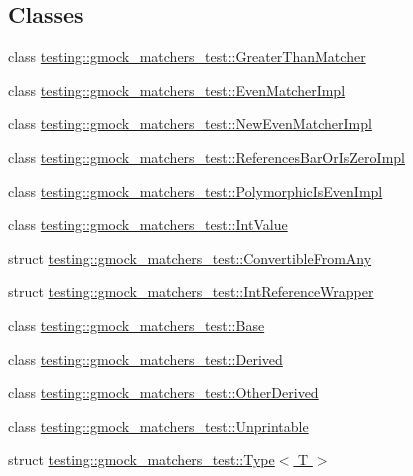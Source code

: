 \subsection*{Classes}
\begin{DoxyCompactItemize}
\item 
class \hyperlink{classtesting_1_1gmock__matchers__test_1_1_greater_than_matcher}{testing\+::gmock\+\_\+matchers\+\_\+test\+::\+Greater\+Than\+Matcher}
\item 
class \hyperlink{classtesting_1_1gmock__matchers__test_1_1_even_matcher_impl}{testing\+::gmock\+\_\+matchers\+\_\+test\+::\+Even\+Matcher\+Impl}
\item 
class \hyperlink{classtesting_1_1gmock__matchers__test_1_1_new_even_matcher_impl}{testing\+::gmock\+\_\+matchers\+\_\+test\+::\+New\+Even\+Matcher\+Impl}
\item 
class \hyperlink{classtesting_1_1gmock__matchers__test_1_1_references_bar_or_is_zero_impl}{testing\+::gmock\+\_\+matchers\+\_\+test\+::\+References\+Bar\+Or\+Is\+Zero\+Impl}
\item 
class \hyperlink{classtesting_1_1gmock__matchers__test_1_1_polymorphic_is_even_impl}{testing\+::gmock\+\_\+matchers\+\_\+test\+::\+Polymorphic\+Is\+Even\+Impl}
\item 
class \hyperlink{classtesting_1_1gmock__matchers__test_1_1_int_value}{testing\+::gmock\+\_\+matchers\+\_\+test\+::\+Int\+Value}
\item 
struct \hyperlink{structtesting_1_1gmock__matchers__test_1_1_convertible_from_any}{testing\+::gmock\+\_\+matchers\+\_\+test\+::\+Convertible\+From\+Any}
\item 
struct \hyperlink{structtesting_1_1gmock__matchers__test_1_1_int_reference_wrapper}{testing\+::gmock\+\_\+matchers\+\_\+test\+::\+Int\+Reference\+Wrapper}
\item 
class \hyperlink{classtesting_1_1gmock__matchers__test_1_1_base}{testing\+::gmock\+\_\+matchers\+\_\+test\+::\+Base}
\item 
class \hyperlink{classtesting_1_1gmock__matchers__test_1_1_derived}{testing\+::gmock\+\_\+matchers\+\_\+test\+::\+Derived}
\item 
class \hyperlink{classtesting_1_1gmock__matchers__test_1_1_other_derived}{testing\+::gmock\+\_\+matchers\+\_\+test\+::\+Other\+Derived}
\item 
class \hyperlink{classtesting_1_1gmock__matchers__test_1_1_unprintable}{testing\+::gmock\+\_\+matchers\+\_\+test\+::\+Unprintable}
\item 
struct \hyperlink{structtesting_1_1gmock__matchers__test_1_1_type}{testing\+::gmock\+\_\+matchers\+\_\+test\+::\+Type$<$ T $>$}

\end{DoxyCompactItemize}
